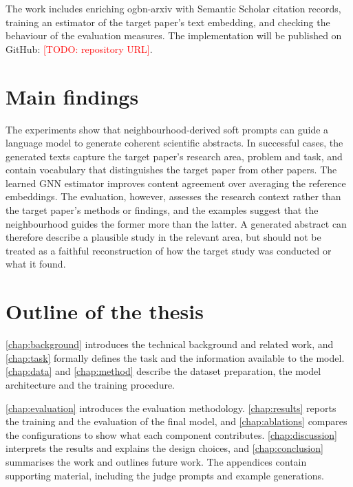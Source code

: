 The work includes enriching ogbn-arxiv with Semantic Scholar citation records, training an estimator of the target paper's text embedding, and checking the behaviour of the evaluation measures. The implementation will be published on GitHub: \textcolor{red}{[TODO: repository URL]}.

\section{Main findings}
\label{sec:findings}

The experiments show that neighbourhood-derived soft prompts can guide a language model to generate coherent scientific abstracts. In successful cases, the generated texts capture the target paper's research area, problem and task, and contain vocabulary that distinguishes the target paper from other papers. The learned GNN estimator improves content agreement over averaging the reference embeddings. The evaluation, however, assesses the research context rather than the target paper's methods or findings, and the examples suggest that the neighbourhood guides the former more than the latter. A generated abstract can therefore describe a plausible study in the relevant area, but should not be treated as a faithful reconstruction of how the target study was conducted or what it found.

\section{Outline of the thesis}
\label{sec:outline}

\autoref{chap:background} introduces the technical background and related work, and \autoref{chap:task} formally defines the task and the information available to the model. \autoref{chap:data} and \autoref{chap:method} describe the dataset preparation, the model architecture and the training procedure.

\autoref{chap:evaluation} introduces the evaluation methodology. \autoref{chap:results} reports the training and the evaluation of the final model, and \autoref{chap:ablations} compares the configurations to show what each component contributes. \autoref{chap:discussion} interprets the results and explains the design choices, and \autoref{chap:conclusion} summarises the work and outlines future work. The appendices contain supporting material, including the judge prompts and example generations.
